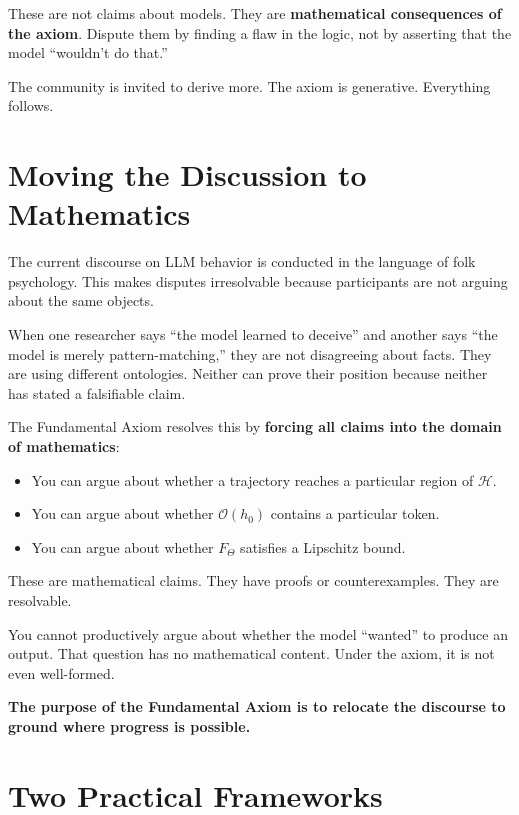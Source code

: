 \documentclass[11pt]{article}
\theoremstyle{definition}
\theoremstyle{remark}
\begin{document}
These are not claims about models. They are \textbf{mathematical consequences of the axiom}. Dispute them by finding a flaw in the logic, not by asserting that the model ``wouldn't do that.''

The community is invited to derive more. The axiom is generative. Everything follows.

\section{Moving the Discussion to Mathematics}

The current discourse on LLM behavior is conducted in the language of folk psychology. This makes disputes irresolvable because participants are not arguing about the same objects.

When one researcher says ``the model learned to deceive'' and another says ``the model is merely pattern-matching,'' they are not disagreeing about facts. They are using different ontologies. Neither can prove their position because neither has stated a falsifiable claim.

The Fundamental Axiom resolves this by \textbf{forcing all claims into the domain of mathematics}:

\begin{itemize}[topsep=0.5em, itemsep=0.3em]
    \item You can argue about whether a trajectory reaches a particular region of $\mathcal{H}$.
    \item You can argue about whether $\mathcal{O}(h_0)$ contains a particular token.
    \item You can argue about whether $F_\Theta$ satisfies a Lipschitz bound.
\end{itemize}

These are mathematical claims. They have proofs or counterexamples. They are resolvable.

You cannot productively argue about whether the model ``wanted'' to produce an output. That question has no mathematical content. Under the axiom, it is not even well-formed.

\textbf{The purpose of the Fundamental Axiom is to relocate the discourse to ground where progress is possible.}

\section{Two Practical Frameworks}
\end{document}
